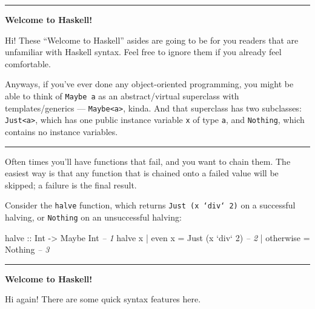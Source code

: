 \documentclass[]{article}
\newenvironment{Shaded}{}{}
\newcommand{\DataTypeTok}[1]{\textcolor[rgb]{0.56,0.13,0.00}{{#1}}}
\newcommand{\DecValTok}[1]{\textcolor[rgb]{0.25,0.63,0.44}{{#1}}}
\newcommand{\CommentTok}[1]{\textcolor[rgb]{0.38,0.63,0.69}{\textit{{#1}}}}
\newcommand{\OtherTok}[1]{\textcolor[rgb]{0.00,0.44,0.13}{{#1}}}
\newcommand{\FunctionTok}[1]{\textcolor[rgb]{0.02,0.16,0.49}{{#1}}}
\newcommand{\NormalTok}[1]{{#1}}
\begin{document}
\begin{center}\rule{0.5\linewidth}{\linethickness}\end{center}

\textbf{Welcome to Haskell!}

Hi! These ``Welcome to Haskell'' asides are going to be for you readers
that are unfamiliar with Haskell syntax. Feel free to ignore them if you
already feel comfortable.

Anyways, if you've ever done any object-oriented programming, you might
be able to think of \texttt{Maybe\ a} as an abstract/virtual superclass
with templates/generics --- \texttt{Maybe\textless{}a\textgreater{}},
kinda. And that superclass has two subclasses:
\texttt{Just\textless{}a\textgreater{}}, which has one public instance
variable \texttt{x} of type \texttt{a}, and \texttt{Nothing}, which
contains no instance variables.

\begin{center}\rule{0.5\linewidth}{\linethickness}\end{center}

Often times you'll have functions that fail, and you want to chain them.
The easiest way is that any function that is chained onto a failed value
will be skipped; a failure is the final result.

Consider the \texttt{halve} function, which returns
\texttt{Just\ (x\ `div`\ 2)} on a successful halving, or
\texttt{Nothing} on an unsuccessful halving:

\begin{Shaded}
\begin{Highlighting}[]
\OtherTok{halve ::} \DataTypeTok{Int} \OtherTok{->} \DataTypeTok{Maybe} \DataTypeTok{Int}                       \CommentTok{-- 1}
\NormalTok{halve x }\FunctionTok{|} \NormalTok{even x    }\FunctionTok{=} \DataTypeTok{Just} \NormalTok{(x }\OtherTok{`div`} \DecValTok{2}\NormalTok{)          }\CommentTok{-- 2}
        \FunctionTok{|} \NormalTok{otherwise }\FunctionTok{=} \DataTypeTok{Nothing}                   \CommentTok{-- 3}
\end{Highlighting}
\end{Shaded}

\begin{center}\rule{0.5\linewidth}{\linethickness}\end{center}

\textbf{Welcome to Haskell!}

Hi again! There are some quick syntax features here.
\end{document}
